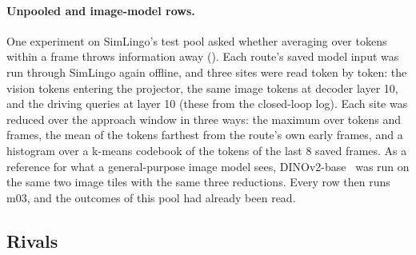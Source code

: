 \paragraph{Unpooled and image-model rows.}
One experiment on SimLingo's test pool asked whether averaging over tokens within
a frame throws information away
(). Each route's saved
model input was run through SimLingo again offline, and three sites were read
token by token: the vision tokens entering the projector, the same image tokens
at decoder layer 10, and the driving queries at layer 10 (these from the
closed-loop log).
Each site was reduced over the approach window in three ways: the maximum over
tokens and frames, the mean of the tokens farthest from the route's own early
frames, and a histogram over a k-means codebook of the tokens of the last 8
saved frames. As a reference for
what a general-purpose image model sees, DINOv2-base~\cite{oquab2024dinov2} was
run on the same two image tiles with the same three reductions. Every row then
runs m03, and the outcomes of this pool had already been read.

\subsection{Rivals}
\label{sec:rivals}

